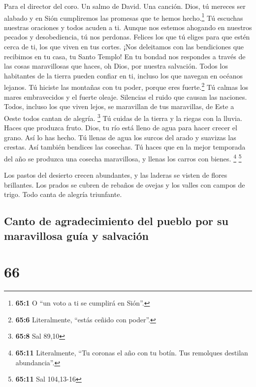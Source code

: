 Para el director del coro. Un salmo de David. Una canción.
 Dios, tú mereces ser alabado y en Sión cumpliremos las
promesas que te hemos hecho.\footnote{\textbf{65:1} O ``un voto a ti se
  cumplirá en Sión''.}  Tú escuchas nuestras oraciones y
todos acuden a ti.  Aunque nos estemos ahogando en
nuestros pecados y desobediencia, tú nos perdonas. 
Felices los que tú eliges para que estén cerca de ti, los que viven en
tus cortes. ¡Nos deleitamos con las bendiciones que recibimos en tu
casa, tu Santo Templo!  En tu bondad nos respondes a
través de las cosas maravillosas que haces, oh Dios, por nuestra
salvación. Todos los habitantes de la tierra pueden confiar en ti,
incluso los que navegan en océanos lejanos.  Tú hiciste
las montañas con tu poder, porque eres fuerte.\footnote{\textbf{65:6}
  Literalmente, ``estás ceñido con poder''.}  Tú calmas
los mares embravecidos y el fuerte oleaje. Silencias el ruido que causan
las naciones.  Todos, incluso los que viven lejos, se
maravillan de tus maravillas, de Este a Oeste todos cantan de alegría.
\footnote{\textbf{65:8} Sal 89,10}  Tú cuidas de la tierra
y la riegas con la lluvia. Haces que produzca fruto. Dios, tu río está
lleno de agua para hacer crecer el grano. Así lo has hecho.
 Tú llenas de agua los surcos del arado y suavizas las
crestas. Así también bendices las cosechas.  Tú haces que
en la mejor temporada del año se produzca una cosecha maravillosa, y
llenas los carros con bienes. \footnote{\textbf{65:11} Literalmente,
  ``Tu coronas el año con tu botín. Tus remolques destilan abundancia''.}
\footnote{\textbf{65:11} Sal 104,13-16}

 Los pastos del desierto crecen abundantes, y las laderas
se visten de flores brillantes.  Los prados se cubren de
rebaños de ovejas y los valles con campos de trigo. Todo canta de
alegría triunfante.

\hypertarget{canto-de-agradecimiento-del-pueblo-por-su-maravillosa-guuxeda-y-salvaciuxf3n}{%
\subsection{Canto de agradecimiento del pueblo por su maravillosa guía y
salvación}\label{canto-de-agradecimiento-del-pueblo-por-su-maravillosa-guuxeda-y-salvaciuxf3n}}

\hypertarget{section-65}{%
\section{66}\label{section-65}}

